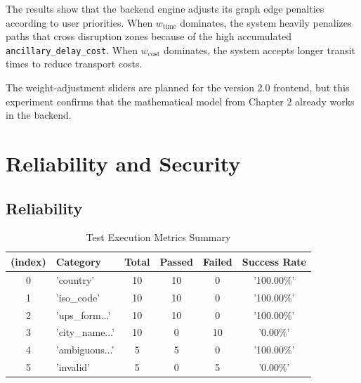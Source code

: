 The results show that the backend engine adjusts its graph edge penalties according to user priorities. When $w_{\text{time}}$ dominates, the system heavily penalizes paths that cross disruption zones because of the high accumulated \texttt{ancillary\_delay\_cost}. When $w_{\text{cost}}$ dominates, the system accepts longer transit times to reduce transport costs.

The weight-adjustment sliders are planned for the version 2.0 frontend, but this experiment confirms that the mathematical model from Chapter 2 already works in the backend.

\section{Reliability and Security}

\subsection{Reliability}

\begin{table}[H]
\centering
\caption{Test Execution Metrics Summary}
\label{tab:test-summary}
\begin{tabularx}{\textwidth}{c l c c c c}
\toprule
\textbf{(index)} & \textbf{Category} & \textbf{Total} & \textbf{Passed} & \textbf{Failed} & \textbf{Success Rate} \\
\midrule
0 & 'country' & 10 & 10 & 0 & '100.00\%' \\
1 & 'iso\_code' & 10 & 10 & 0 & '100.00\%' \\
2 & 'ups\_form...' & 10 & 10 & 0 & '100.00\%' \\
3 & 'city\_name...' & 10 & 0 & 10 & '0.00\%' \\
4 & 'ambiguous...' & 5 & 5 & 0 & '100.00\%' \\
5 & 'invalid' & 5 & 0 & 5 & '0.00\%' \\
\bottomrule
\end{tabularx}
\end{table}

\vspace{0.5cm}

